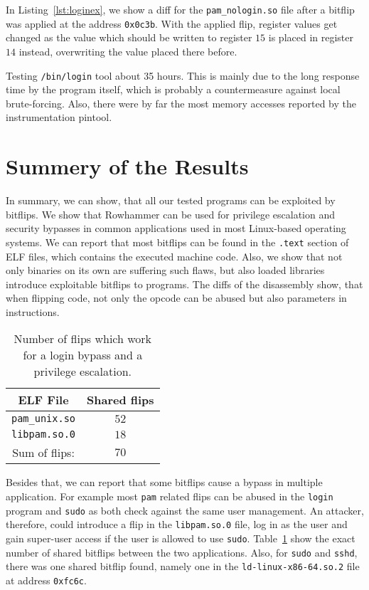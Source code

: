 In Listing~\ref{lst:loginex}, we show a diff for the \texttt{pam\_nologin.so}
file after a bitflip was applied at the address \texttt{0x0c3b}. With
the applied flip, register values get changed as the value which should be
written to register $15$ is placed in register $14$ instead, overwriting the
value placed there before.

Testing \texttt{/bin/login} tool about 35 hours. This is mainly due to the long
response time by the program itself, which is probably a countermeasure against
local brute-forcing. Also, there were by far the most memory accesses reported
by the instrumentation pintool.

\section{Summery of the Results}

In summary, we can show, that all our tested programs can be exploited by
bitflips. We show that Rowhammer can be used for privilege escalation and
security bypasses in common applications used in most Linux-based operating
systems. We can report that most bitflips can be found in the \texttt{.text}
section of ELF files, which contains the executed machine code. Also, we show
that not only binaries on its own are suffering such flaws, but also loaded
libraries introduce exploitable bitflips to programs. The diffs of the
disassembly show, that when flipping code, not only the opcode can be abused but
also parameters in instructions.

\begin{table}[!htb]
\centering
\begin{tabular}{c|c}
ELF File               & Shared flips \\ \hline
\texttt{pam\_unix.so} & $52$ \\
\texttt{libpam.so.0} & $18$ \\ \hline
Sum of flips:                 & $70$
\end{tabular}
\caption{Number of flips which work for a login bypass and a 
privilege escalation.}
\label{tab:loginsudo}
\end{table}

Besides that, we can report that some bitflips cause a bypass in multiple
application. For example most \texttt{pam} related flips can be abused in the
\texttt{login} program and \texttt{sudo} as both check against the same user
management. An attacker, therefore, could introduce a flip in the
\texttt{libpam.so.0} file, log in as the user and gain super-user access if the
user is allowed to use \texttt{sudo}. Table~\ref{tab:loginsudo} show the exact
number of shared bitflips between the two applications. Also, for \texttt{sudo}
and \texttt{sshd}, there was one shared bitflip found, namely one in the
\texttt{ld-linux-x86-64.so.2} file at address \texttt{0xfc6c}.

